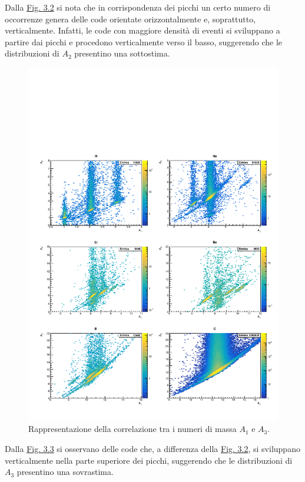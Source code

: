 \documentclass[12pt,a4paper,twoside]{report}
\begin{document}
	Dalla \hyperref[fig:a1]{Fig. 3.2} si nota che in corrispondenza dei picchi un certo numero di occorrenze genera delle code orientate orizzontalmente e, soprattutto, verticalmente. Infatti, le code con maggiore densità di eventi si sviluppano a partire dai picchi e procedono verticalmente verso il basso, suggerendo che le distribuzioni di $A_2$ presentino una sottostima.
	\begin{figure}[H]
		\centering
		\includegraphics[width=1.03\linewidth,center]{c_MultiCanvasLog2.pdf}
		\caption{Rappresentazione della correlazione tra i numeri di massa $A_1$ e $A_3$.}
		\label{fig:a2}
	\end{figure}
	Dalla \hyperref[fig:a2]{Fig. 3.3} si osservano delle code che, a differenza della \hyperref[fig:a1]{Fig. 3.2}, si sviluppano verticalmente nella parte superiore dei picchi, suggerendo che le distribuzioni di $A_3$ presentino una sovrastima.
\end{document}
